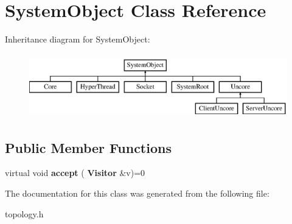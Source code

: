 \section{System\+Object Class Reference}
\label{classSystemObject}
Inheritance diagram for System\+Object\+:\begin{figure}[H]
\begin{center}
\leavevmode
\includegraphics[height=2.800000cm]{classSystemObject}
\end{center}
\end{figure}
\subsection*{Public Member Functions}
\begin{DoxyCompactItemize}
\item 
\mbox{\label{classSystemObject_a971fa4d9df2cd89570dd9d248cb029db}} 
virtual void {\bfseries accept} (\textbf{ Visitor} \&v)=0
\end{DoxyCompactItemize}


The documentation for this class was generated from the following file\+:\begin{DoxyCompactItemize}
\item 
topology.\+h\end{DoxyCompactItemize}
